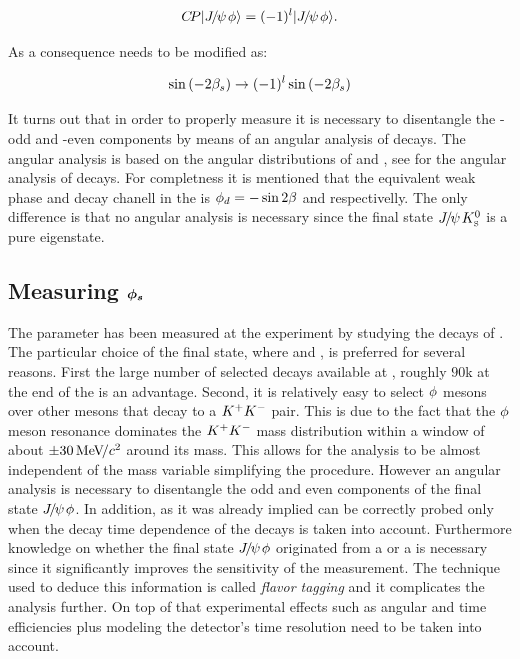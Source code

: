 \begin{equation}
  \centering
  \CP\ket{\jpsi\Pphi} = (-1)^l\ket{\jpsi\Pphi}.
 \label{cp_eigenstates}
\end{equation}

\noindent As a consequence  needs to be modified as:

\begin{equation}
  \centering
  \sin \parenthesis{-2\betas} \to (-1)^l \sin \parenthesis{-2\betas}
 \label{phis_def}
\end{equation}

It turns out that in order to properly measure \phis it is necessary to disentangle the \CP-odd and \CP-even
components by means of an angular analysis of \BsJpsiPhi decays. The angular analysis is based on the
angular distributions of \phiKK and \Jpsimumu, see  for the angular analysis
of \BsJpsiKst decays. For completness it is mentioned that the equivalent weak phase and decay chanell in
the \BdBdbarSyst is $\phi_{d} = -\sin 2\beta$ and \BdJpsiKS respectivelly. The only difference is that no
angular analysis is necessary since the final state ${J\mskip -3mu/\mskip -2mu\psi\mskip 2mu}K^0_{\rm\scriptscriptstyle S}$ is a pure \CP eigenstate.

\subsection{Measuring $\boldsymbol{\phi_{s}}$}
\label{measuring_phis}

The parameter \phis has been measured at the \lhcb experiment by studying the decays of \BsJpsiPhi \cite{phis-3fb-paper}.
The particular choice of the final state, where \phiKK and \Jpsimumu, is preferred for several reasons. First the large number
of selected \BsJpsiPhi decays available at \lhcb, roughly $90$k at the end of the \runtwo is an advantage. Second, it is relatively
easy to select $\phi$ mesons over other mesons that decay to a $K^+K^-$ pair. This is due to the fact that the $\phi$ meson resonance dominates
the $K^+K^-$ mass distribution within a window of about $\pm 30 {\mathrm{\,Me\kern -0.1em V\!/}c^2}$ around its mass. This allows for the analysis to be
almost independent of the \mKK mass variable simplifying the procedure. However an angular analysis is necessary
to disentangle the odd and even \CP components of the final state ${J\mskip -3mu/\mskip -2mu\psi\mskip 2mu}\phi$.
In addition, as it was already implied \phis can be correctly probed only when the decay time dependence of the \BsJpsiPhi decays is taken into
account. Furthermore knowledge on whether the final state ${J\mskip -3mu/\mskip -2mu\psi\mskip 2mu}\phi$ originated from a \Bs or a \Bsb is necessary since it
significantly improves the sensitivity of the \phis measurement. The technique used to deduce this information is called {\it flavor tagging}
and it complicates the analysis further. On top of that experimental effects such as angular and time efficiencies plus modeling the
\lhcb detector's time resolution need to be taken into account.

